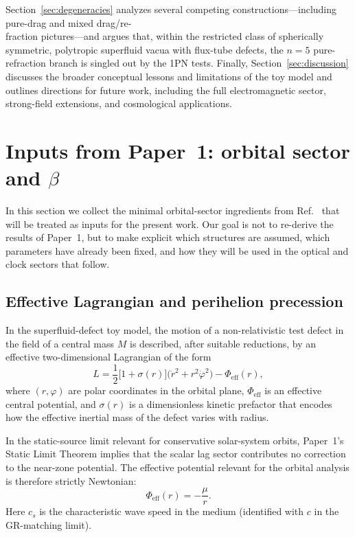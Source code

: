 \documentclass[11pt]{article}
\newcommand{\cS}{c_s}
\begin{document}
Section~\ref{sec:degeneracies} analyzes several competing constructions---including
pure-drag and mixed drag/re-\\
fraction pictures---and argues that, within the
restricted class of spherically symmetric, polytropic superfluid vacua with
flux-tube defects, the $n=5$ pure-refraction branch is singled out by the 1PN
tests.
Finally, Section~\ref{sec:discussion} discusses the broader conceptual lessons and
limitations of the toy model and outlines directions for future work, including
the full electromagnetic sector, strong-field extensions, and cosmological
applications.

\section{Inputs from Paper~1: orbital sector and \texorpdfstring{$\beta$}{beta}}
\label{sec:paper1-inputs}

In this section we collect the minimal orbital-sector ingredients from
Ref.~\cite{Norris:2025Orbits} that will be treated as inputs for the present
work.
Our goal is not to re-derive the results of Paper~1, but to make explicit
which structures are assumed, which parameters have already been fixed, and
how they will be used in the optical and clock sectors that follow.

\subsection{Effective Lagrangian and perihelion precession}
\label{subsec:paper1-lagrangian}

In the superfluid-defect toy model, the motion of a non-relativistic test
defect in the field of a central mass $M$ is described, after suitable
reductions, by an effective two-dimensional Lagrangian of the form
\begin{equation}
  L
  = \frac{1}{2}\bigl[1 + \sigma(r)\bigr]
      \bigl(\dot r^2 + r^2 \dot\varphi^2\bigr)
    - \Phi_{\mathrm{eff}}(r),
  \label{eq:paper1-L-eff}
\end{equation}
where $(r,\varphi)$ are polar coordinates in the orbital plane,
$\Phi_{\mathrm{eff}}$ is an effective central potential, and
$\sigma(r)$ is a dimensionless kinetic prefactor that encodes how the
effective inertial mass of the defect varies with radius.

In the static-source limit relevant for conservative solar-system orbits,
Paper~1's Static Limit Theorem implies that the scalar lag sector contributes
no correction to the near-zone potential.  The effective potential relevant for
the orbital analysis is therefore strictly Newtonian:
\begin{equation}
  \Phi_{\mathrm{eff}}(r)
  = -\frac{\mu}{r}.
  \label{eq:paper1-Phi-eff}
\end{equation}
Here $\cS$ is the characteristic wave speed in the medium (identified with $c$
in the GR-matching limit).
\end{document}
